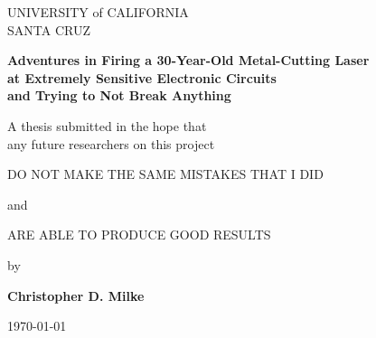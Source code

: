 \documentclass{report}
\begin{document}
	\begin{titlepage} \begin{singlespace}
        \begin{center} \begin{large}
            UNIVERSITY of CALIFORNIA \\ SANTA CRUZ

            \vspace{\baselineskip}

            \textbf{Adventures in Firing a 30-Year-Old Metal-Cutting Laser \\ at Extremely Sensitive Electronic Circuits \\ and Trying to Not Break Anything}

            \vspace{\baselineskip}

            A thesis submitted in the hope that \\ any future researchers on this project

            \vspace{\baselineskip}

            DO NOT MAKE THE SAME MISTAKES THAT I DID

            \vspace{\baselineskip}

            and

            \vspace{\baselineskip}

            ARE ABLE TO PRODUCE GOOD RESULTS

            \vspace{\baselineskip}

            by

            \vspace{\baselineskip}

            \textbf{Christopher D. Milke}

            \vspace{\baselineskip}

            \today

            \vspace*{\fill}

            \end{large}
        \end{center}

	\end{singlespace} \end{titlepage}
\end{document}
